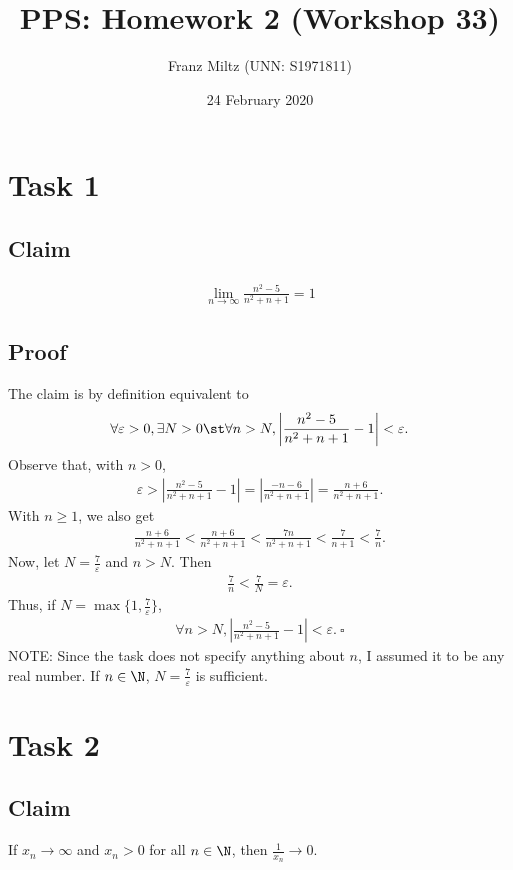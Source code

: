 \documentclass{article}
\title{PPS: Homework 2 (Workshop 33)}
\author{Franz Miltz (UNN: S1971811)}
\date{24 February 2020}
\begin{document}
\maketitle
\section*{Task 1}
\subsection*{Claim}
\begin{align*}
  \lim_{n\to\infty}\frac{n^2-5}{n^2+n+1}=1
\end{align*}
\subsection*{Proof}
The claim is by definition equivalent to
\begin{align*}
  \forall \varepsilon > 0, \exists N>0 \st \forall n>N, \left|\frac{n^2-5}{n^2+n+1}-1\right|<\varepsilon.
\end{align*}
Observe that, with $n>0$,
\begin{align*}
  \varepsilon > \left|\frac{n^2-5}{n^2+n+1}-1\right|
  =  \left|\frac{-n-6}{n^2+n+1}\right|
  =  \frac{n+6}{n^2+n+1}.
\end{align*}
With $n\geq 1$, we also get
\begin{align*}
  \frac{n+6}{n^2+n+1}<\frac{n+6}{n^2+n+1}<\frac{7n}{n^2+n+1}<\frac{7}{n+1}<\frac{7}{n}.
\end{align*}
Now, let $N=\frac{7}{\varepsilon}$ and $n>N$. Then
\begin{align*}
  \frac{7}{n}<\frac{7}{N}=\varepsilon.
\end{align*}
Thus, if $N = \max\{1, \frac{7}{\varepsilon}\}$,
\begin{align*}
  \forall n > N, \left|\frac{n^2-5}{n^2+n+1}-1\right|<\varepsilon.\:\square
\end{align*}
NOTE: Since the task does not specify anything about $n$, I assumed it to be any real number. If $n\in\N$, $N=\frac{7}{\varepsilon}$ is sufficient.
\section*{Task 2}
\subsection*{Claim}
If $x_n\to\infty$ and $x_n>0$ for all $n\in\N$, then $\frac{1}{x_n}\to 0$.
\end{document}
